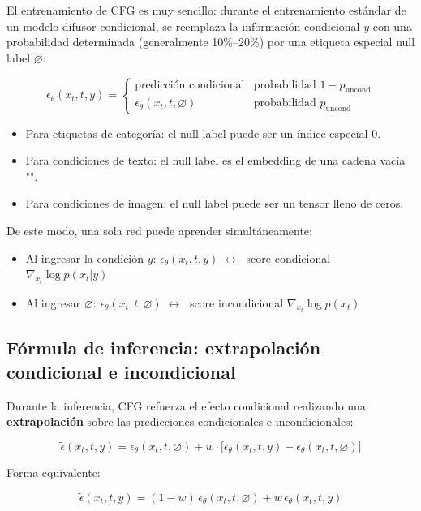 \documentclass[a4paper]{article}
\begin{document}
El entrenamiento de CFG es muy sencillo: durante el entrenamiento estándar de un modelo difusor condicional, se reemplaza la información condicional $y$ con una probabilidad determinada (generalmente 10\%--20\%) por una etiqueta especial null label $\varnothing$:

$$
\epsilon_\theta(x_t, t, y) = \begin{cases}
\text{predicción condicional} & \text{probabilidad } 1-p_{\text{uncond}} \\
\epsilon_\theta(x_t, t, \varnothing) & \text{probabilidad } p_{\text{uncond}}
\end{cases}
$$

\begin{itemize}
    \item Para etiquetas de categoría: el null label puede ser un índice especial 0.
    \item Para condiciones de texto: el null label es el embedding de una cadena vacía "".
    \item Para condiciones de imagen: el null label puede ser un tensor lleno de ceros.
\end{itemize}

De este modo, una sola red puede aprender simultáneamente:
\begin{itemize}
    \item Al ingresar la condición $y$: $\epsilon_\theta(x_t, t, y) \;\longleftrightarrow\;$ score condicional $\nabla_{x_t}\log p(x_t|y)$
    \item Al ingresar $\varnothing$: $\epsilon_\theta(x_t, t, \varnothing) \;\longleftrightarrow\;$ score incondicional $\nabla_{x_t}\log p(x_t)$
\end{itemize}

\subsection{Fórmula de inferencia: extrapolación condicional e incondicional}

Durante la inferencia, CFG refuerza el efecto condicional realizando una \textbf{extrapolación} sobre las predicciones condicionales e incondicionales:

$$
\tilde{\epsilon}(x_t, t, y) = \epsilon_\theta(x_t, t, \varnothing) + w \cdot \bigl[\epsilon_\theta(x_t, t, y) - \epsilon_\theta(x_t, t, \varnothing)\bigr]
$$

Forma equivalente:

$$
\tilde{\epsilon}(x_t, t, y) = (1-w)\,\epsilon_\theta(x_t, t, \varnothing) + w\,\epsilon_\theta(x_t, t, y)
$$
\end{document}
